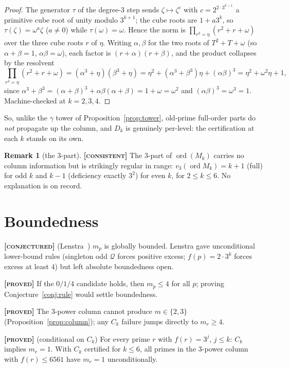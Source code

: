 \documentclass[11pt]{article}
\theoremstyle{plain}
\theoremstyle{definition}
\newtheorem{remark}{Remark}
\newcommand{\ord}{\operatorname{ord}}
\newcommand{\Qset}{\mathcal{Q}}
\newcommand{\PROVED}{\textbf{[\textsc{proved}]}}
\newcommand{\CONSISTENT}{\textbf{[\textsc{consistent}]}}
\newcommand{\CONJECTURED}{\textbf{[\textsc{conjectured}]}}
\begin{document}
\begin{proof}
The generator $\tau$ of the degree-$3$ step sends $\zeta\mapsto
\zeta^{c}$ with $c=2^{2\cdot3^{k-1}}$ a primitive cube root of unity
modulo $3^{k+1}$; the cube roots are $1+a3^k$, so
$\tau(\zeta)=\omega^{a}\zeta$ ($a\neq0$) while $\tau(\omega)=\omega$.
Hence the norm is $\prod_{r^3=\eta}(r^2+r+\omega)$ over the three cube
roots $r$ of $\eta$. Writing $\alpha,\beta$ for the two roots of
$T^2+T+\omega$ (so $\alpha+\beta=1$, $\alpha\beta=\omega$), each factor
is $(r+\alpha)(r+\beta)$, and the product collapses by the resolvent
\[
  \prod_{r^3=\eta}(r^2+r+\omega)
  =(\alpha^3+\eta)(\beta^3+\eta)
  =\eta^2+(\alpha^3+\beta^3)\eta+(\alpha\beta)^3
  =\eta^2+\omega^2\eta+1,
\]
since $\alpha^3+\beta^3=(\alpha+\beta)^3+\alpha\beta(\alpha+\beta)
=1+\omega=\omega^2$ and $(\alpha\beta)^3=\omega^3=1$. Machine-checked at
$k=2,3,4$.
\end{proof}

So, unlike the $\gamma$ tower of Proposition~\ref{prop:tower},
old-prime full-order parts do \emph{not} propagate up the column, and
$D_k$ is genuinely per-level: the certification at each $k$ stands on
its own.

\begin{remark}[the $3$-part]\label{rem:threepart}
\CONSISTENT{} The $3$-part of $\ord(M_k)$ carries no column information
but is strikingly regular in range: $v_3(\ord M_k)=k+1$ (full) for odd
$k$ and $k-1$ (deficiency exactly $3^2$) for even $k$, for
$2\leq k\leq6$. No explanation is on record.
\end{remark}

\section{Boundedness}\label{sec:bounded}

\CONJECTURED{} (Lenstra~\cite{Lenstra77}) $m_p$ is globally bounded.
Lenstra gave unconditional lower-bound rules (singleton odd $\Qset$
forces positive excess; $f(p)=2\cdot3^k$ forces excess at least $4$) but
left absolute boundedness open.

\PROVED{} If the $0/1/4$ candidate holds, then $m_p\leq4$ for all $p$;
proving Conjecture~\ref{conj:rule} would settle boundedness.

\PROVED{} The $3$-power column cannot produce $m\in\{2,3\}$
(Proposition~\ref{prop:column}); any $C_k$ failure jumps directly to
$m_r\geq4$.

\PROVED{} (conditional on $C_k$) For every prime $r$ with $f(r)=3^j$,
$j\leq k$: $C_k$ implies $m_r=1$. With $C_k$ certified for $k\leq6$, all
primes in the $3$-power column with $f(r)\leq6561$ have $m_r=1$
unconditionally.
\end{document}
